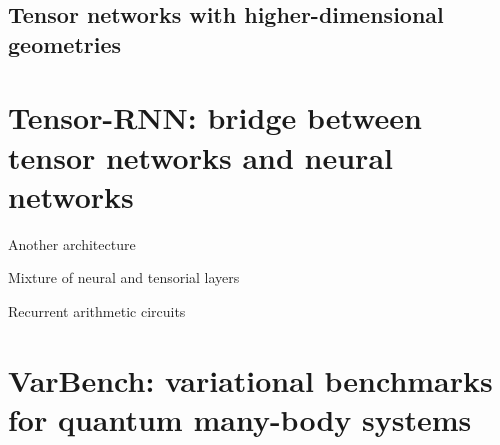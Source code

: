 \section{Tensor networks with higher-dimensional geometries}

\chapter{Tensor-RNN: bridge between tensor networks and neural networks}

Another architecture~\cite{hibat2021variational, hibat2022supplementing}

Mixture of neural and tensorial layers~\cite{chen2023antn}

Recurrent arithmetic circuits~\cite{levine2017long, levine2019quantum}

\chapter{VarBench: variational benchmarks for quantum many-body systems}
\label{ch:varbench}
